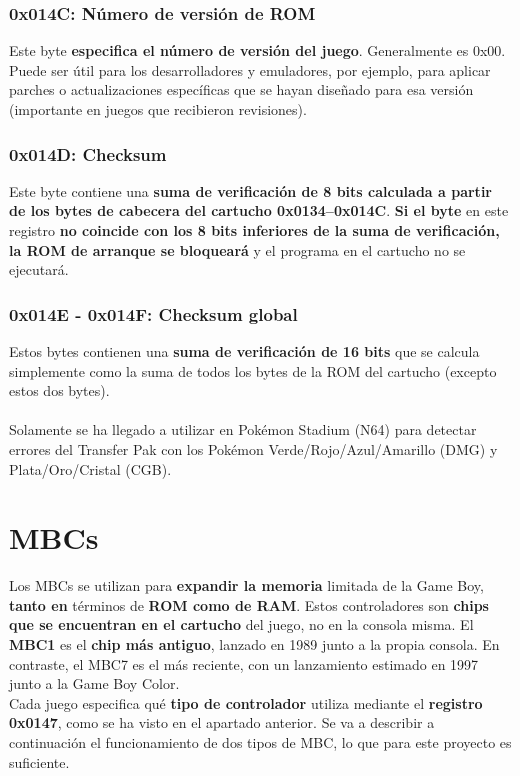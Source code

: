 \subsubsection{0x014C: Número de versión de ROM}
Este byte \textbf{especifica el número de versión del juego}. Generalmente es 0x00. Puede ser útil para los desarrolladores y emuladores, por ejemplo, para aplicar parches o actualizaciones específicas que se hayan diseñado para esa versión (importante en juegos que recibieron revisiones).

\subsubsection{0x014D: Checksum}
Este byte contiene una \textbf{suma de verificación de 8 bits calculada a partir de los bytes de cabecera del cartucho 0x0134–0x014C}. \textbf{Si el byte} en este registro \textbf{no coincide con los 8 bits inferiores de la suma de verificación, la ROM de arranque se bloqueará} y el programa en el cartucho no se ejecutará.

\subsubsection{0x014E - 0x014F: Checksum global}
Estos bytes contienen una \textbf{suma de verificación de 16 bits} que se calcula simplemente como la suma de todos los bytes de la ROM del cartucho (excepto estos dos bytes).\\\\
Solamente se ha llegado a utilizar en Pokémon Stadium (N64) para detectar errores del Transfer Pak con los Pokémon Verde/Rojo/Azul/Amarillo (DMG) y Plata/Oro/Cristal (CGB).

\section{MBCs}
\label{history_mbcs}

Los MBCs se utilizan para \textbf{expandir la memoria} limitada de la Game Boy, \textbf{tanto en} términos de \textbf{ROM como de RAM}. Estos controladores son \textbf{chips que se encuentran en el cartucho} del juego, no en la consola misma. El \textbf{MBC1} es el \textbf{chip más antiguo}, lanzado en 1989 junto a la propia consola. En contraste, el MBC7 es el más reciente, con un lanzamiento estimado en 1997 junto a la Game Boy Color.
\\
Cada juego especifica qué \textbf{tipo de controlador} utiliza mediante el \textbf{registro 0x0147}, como se ha visto en el apartado anterior. Se va a describir a continuación el funcionamiento de dos tipos de MBC, lo que para este proyecto es suficiente.

